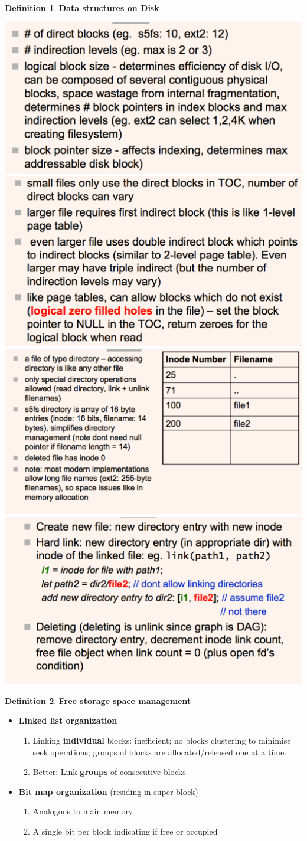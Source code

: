 \documentclass[11pt,a4paper]{article}
\theoremstyle{definition}
\newtheorem{definition}{Definition}[section]
\newenvironment{myitemize}
{ \begin{itemize}
    \setlength{\itemsep}{5pt}
    \setlength{\parskip}{0pt}
    \setlength{\parsep}{0pt}     }
{ \end{itemize}                  }
\newenvironment{myenumerate}
{ \begin{enumerate}
    \setlength{\itemsep}{5pt}
    \setlength{\parskip}{0pt}
    \setlength{\parsep}{0pt}     }
{ \end{enumerate}                }
\begin{document}
\begin{definition}{\textbf{Data structures on Disk}}
\begin{myitemize}
\begin{myenumerate}
			\includegraphics[width=0.50\linewidth]{m2/systemVFileSystem5}
			\includegraphics[width=0.50\linewidth]{m2/systemVFileSystem6}
			\includegraphics[width=0.50\linewidth]{m2/systemVFileSystem7}
			\includegraphics[width=0.50\linewidth]{m2/systemVFileSystem8}
		\end{myenumerate}
	\end{myitemize}
\end{definition}

\begin{definition}{\textbf{Free storage space management}}
	\begin{myitemize}
		\item \textbf{Linked list organization}
		\begin{myenumerate}
			\item Linking \textbf{individual} blocks: inefficient; no blocks clustering to minimise seek operations; groups of blocks are allocated/released one at a time.
			\item Better: Link \textbf{groups} of consecutive blocks
		\end{myenumerate}
		\item \textbf{Bit map organization} (residing in super block)
		\begin{myenumerate}
			\item Analogous to main memory
			\item A single bit per block indicating if free or occupied
		\end{myenumerate}
	\end{myitemize}
\end{definition}

\end{document}
